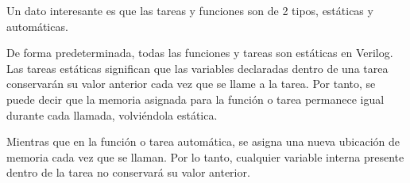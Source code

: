 Un dato interesante es que las tareas y funciones son de 2 tipos, estáticas y automáticas.

De forma predeterminada, todas las funciones y tareas son estáticas en Verilog. Las tareas estáticas significan que las variables declaradas dentro de una tarea conservarán su valor anterior cada vez que se llame a la tarea. Por tanto, se puede decir que la memoria asignada para la función o tarea permanece igual durante cada llamada, volviéndola estática.

Mientras que en la función o tarea automática, se asigna una nueva ubicación de memoria cada vez que se llaman. Por lo tanto, cualquier variable interna presente dentro de la tarea no conservará su valor anterior. \cite{octet_2021}